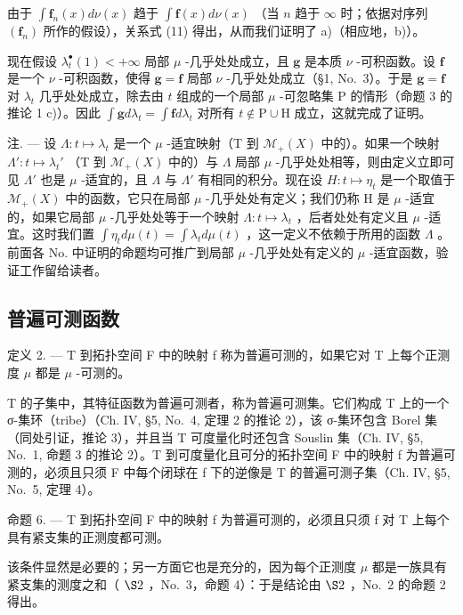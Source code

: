 由于 \(\int \mathbf{f}_n(x) d\nu(x)\) 趋于 \(\int \mathbf{f}(x) d\nu(x)\) （当 \(n\) 趋于 \(\infty\) 时；依据对序列 \((\mathbf{f}_n)\) 所作的假设），关系式 (11) 得出，从而我们证明了 a)（相应地，b)）。

现在假设 \(\lambda_t^\bullet(1) < +\infty\) 局部 \(\mu\) -几乎处处成立，且 \(\mathbf{g}\) 是本质 \(\nu\) -可积函数。设 \(\mathbf{f}\) 是一个 \(\nu\) -可积函数，使得 \(\mathbf{g} = \mathbf{f}\) 局部 \(\nu\) -几乎处处成立（§1, No.~3）。于是 \(\mathbf{g} = \mathbf{f}\) 对 \(\lambda_t\) 几乎处处成立，除去由 \(t\) 组成的一个局部 \(\mu\) -可忽略集 \(\mathrm{P}\) 的情形（命题 3 的推论 1 c)）。因此 \(\int \mathbf{g} d\lambda_t = \int \mathbf{f} d\lambda_t\) 对所有 \(t \notin \mathrm{P} \cup \mathrm{H}\) 成立，这就完成了证明。

注. --- 设 \(\Lambda: t \mapsto \lambda_{t}\) 是一个 \(\mu\) -适宜映射（T 到 \(\mathcal{M}_{+}(X)\) 中的）。如果一个映射 \(\Lambda': t \mapsto \lambda_{t}'\) （T 到 \(\mathcal{M}_{+}(X)\) 中的）与 \(\Lambda\) 局部 \(\mu\) -几乎处处相等，则由定义立即可见 \(\Lambda'\) 也是 \(\mu\) -适宜的，且 \(\Lambda\) 与 \(\Lambda'\) 有相同的积分。现在设 \(H: t \mapsto \eta_{t}\) 是一个取值于 \(\mathcal{M}_{+}(X)\) 中的函数，它只在局部 \(\mu\) -几乎处处有定义；我们仍称 H 是 \(\mu\) -适宜的，如果它局部 \(\mu\) -几乎处处等于一个映射 \(\Lambda: t \mapsto \lambda_{t}\) ，后者处处有定义且 \(\mu\) -适宜。这时我们置 \(\int \eta_{t} d\mu(t) = \int \lambda_{t} d\mu(t)\) ，这一定义不依赖于所用的函数 \(\Lambda\) 。前面各 No. 中证明的命题均可推广到局部 \(\mu\) -几乎处处有定义的 \(\mu\) -适宜函数，验证工作留给读者。

\subsection{普遍可测函数}

定义 2. --- T 到拓扑空间 F 中的映射 f 称为普遍可测的，如果它对 T 上每个正测度 \(\mu\) 都是 \(\mu\) -可测的。

T 的子集中，其特征函数为普遍可测者，称为普遍可测集。它们构成 T 上的一个 σ-集环（tribe）（Ch. IV, §5, No.~4, 定理 2 的推论 2），该 σ-集环包含 Borel 集（同处引证，推论 3），并且当 T 可度量化时还包含 Souslin 集（Ch. IV, §5, No.~1, 命题 3 的推论 2）。T 到可度量化且可分的拓扑空间 F 中的映射 f 为普遍可测的，必须且只须 F 中每个闭球在 f 下的逆像是 T 的普遍可测子集（Ch. IV, §5, No.~5, 定理 4）。

命题 6. --- T 到拓扑空间 F 中的映射 f 为普遍可测的，必须且只须 f 对 T 上每个具有紧支集的正测度都可测。

该条件显然是必要的；另一方面它也是充分的，因为每个正测度 \(\mu\) 都是一族具有紧支集的测度之和（ \(\S2\) ，No.~3，命题 4）：于是结论由 \(\S2\) ，No.~2 的命题 2 得出。

